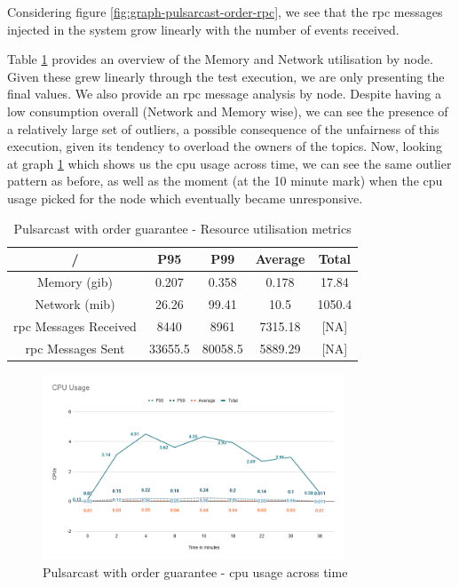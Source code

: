 Considering figure \ref{fig:graph-pulsarcast-order-rpc}, we see that the \acrshort{rpc}
messages injected in the system grow linearly with the number of events
received.

Table \ref{table:pulsarcast-order} provides an overview of the Memory and
Network utilisation by node. Given these grew linearly through the test
execution, we are only presenting the final values. We also provide an \acrshort{rpc}
message analysis by node. Despite having a low consumption overall (Network and
Memory wise), we can see the presence of a relatively large set of outliers, a
possible consequence of the unfairness of this execution, given its tendency to
overload the owners of the topics. Now, looking at graph
\ref{fig:graph-pulsarcast-order-cpu} which shows us the \acrshort{cpu} usage across time,
we can see the same outlier pattern as before, as well as the moment (at the 10
minute mark) when the \acrshort{cpu} usage picked for the node which eventually became
unresponsive.

\begin{table}[!htb]
\caption{Pulsarcast with order guarantee - Resource utilisation metrics}
\label{table:pulsarcast-order}
  \begin{center}
   \begin{tabular}{|c| c c c c|} 
   \hline
   / & P95 & P99 & Average & Total \\ [0.5ex] 
   \hline\hline
   Memory (\acrshort{gib}) & 0.207 & 0.358 & 0.178 & 17.84 \\
   \hline
   Network (\acrshort{mib}) & 26.26 & 99.41 & 10.5 & 1050.4 \\
   \hline
   \acrshort{rpc} Messages Received & 8440 & 8961 & 7315.18 & [NA] \\
   \hline
   \acrshort{rpc} Messages Sent & 33655.5 & 80058.5 & 5889.29 & [NA] \\ [1ex] 
   \hline
  \end{tabular}
  \end{center}
\end{table}

\begin{figure}[!htb]
  \centering
  \includegraphics[width=0.8\textwidth]{img/graph-pulsarcast-order-cpu.png}
  \caption{Pulsarcast with order guarantee - \acrshort{cpu} usage across time}
  \label{fig:graph-pulsarcast-order-cpu}
\end{figure}

